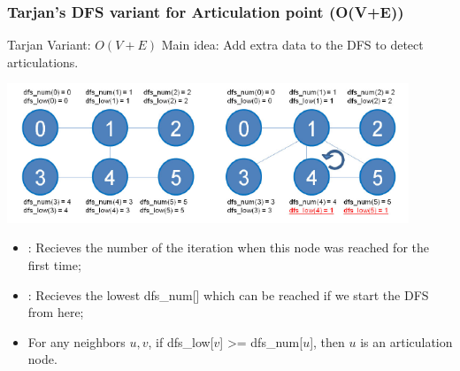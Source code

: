 \begin{frame}
  \frametitle{Tarjan's DFS variant for Articulation point (O(V+E))}
  {\smaller
    \begin{exampleblock}{Tarjan Variant: $O(V+E)$}
      Main idea: Add extra data to the DFS to detect articulations.
    \end{exampleblock}
      \begin{center}
        \includegraphics[width=0.9\textwidth]{../img/graph_articulation}
      \end{center}
    \begin{itemize}
    \item {}: Recieves the number of the iteration
      when this node was reached for the first time;
    \item {}: Recieves the lowest dfs\_num[] which
      can be reached if we start the DFS from here;
    \item For any neighbors $u,v$, if dfs\_low[$v$] >= dfs\_num[$u$],
      then $u$ is an articulation node.
    \end{itemize}
  }
\end{frame}

